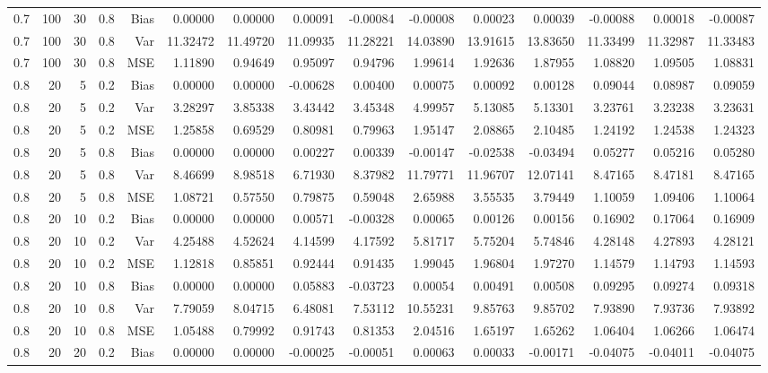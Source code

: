 \begin{table}[!htbp]
\begin{tabular}{lrrrrrrrrrrrrrr}
0.7 & 100 & 30 & 0.8 & Bias & 0.00000 & 0.00000 & 0.00091 & -0.00084 & -0.00008 & 0.00023 & 0.00039 & -0.00088 & 0.00018 & -0.00087 \\
0.7 & 100 & 30 & 0.8 & Var & 11.32472 & 11.49720 & 11.09935 & 11.28221 & 14.03890 & 13.91615 & 13.83650 & 11.33499 & 11.32987 & 11.33483 \\
0.7 & 100 & 30 & 0.8 & MSE & 1.11890 & 0.94649 & 0.95097 & 0.94796 & 1.99614 & 1.92636 & 1.87955 & 1.08820 & 1.09505 & 1.08831 \\
0.8 &  20 &  5 & 0.2 & Bias & 0.00000 & 0.00000 & -0.00628 & 0.00400 & 0.00075 & 0.00092 & 0.00128 & 0.09044 & 0.08987 & 0.09059 \\
0.8 &  20 &  5 & 0.2 & Var & 3.28297 & 3.85338 & 3.43442 & 3.45348 & 4.99957 & 5.13085 & 5.13301 & 3.23761 & 3.23238 & 3.23631 \\
0.8 &  20 &  5 & 0.2 & MSE & 1.25858 & 0.69529 & 0.80981 & 0.79963 & 1.95147 & 2.08865 & 2.10485 & 1.24192 & 1.24538 & 1.24323 \\
0.8 &  20 &  5 & 0.8 & Bias & 0.00000 & 0.00000 & 0.00227 & 0.00339 & -0.00147 & -0.02538 & -0.03494 & 0.05277 & 0.05216 & 0.05280 \\
0.8 &  20 &  5 & 0.8 & Var & 8.46699 & 8.98518 & 6.71930 & 8.37982 & 11.79771 & 11.96707 & 12.07141 & 8.47165 & 8.47181 & 8.47165 \\
0.8 &  20 &  5 & 0.8 & MSE & 1.08721 & 0.57550 & 0.79875 & 0.59048 & 2.65988 & 3.55535 & 3.79449 & 1.10059 & 1.09406 & 1.10064 \\
0.8 &  20 & 10 & 0.2 & Bias & 0.00000 & 0.00000 & 0.00571 & -0.00328 & 0.00065 & 0.00126 & 0.00156 & 0.16902 & 0.17064 & 0.16909 \\
0.8 &  20 & 10 & 0.2 & Var & 4.25488 & 4.52624 & 4.14599 & 4.17592 & 5.81717 & 5.75204 & 5.74846 & 4.28148 & 4.27893 & 4.28121 \\
0.8 &  20 & 10 & 0.2 & MSE & 1.12818 & 0.85851 & 0.92444 & 0.91435 & 1.99045 & 1.96804 & 1.97270 & 1.14579 & 1.14793 & 1.14593 \\
0.8 &  20 & 10 & 0.8 & Bias & 0.00000 & 0.00000 & 0.05883 & -0.03723 & 0.00054 & 0.00491 & 0.00508 & 0.09295 & 0.09274 & 0.09318 \\
0.8 &  20 & 10 & 0.8 & Var & 7.79059 & 8.04715 & 6.48081 & 7.53112 & 10.55231 & 9.85763 & 9.85702 & 7.93890 & 7.93736 & 7.93892 \\
0.8 &  20 & 10 & 0.8 & MSE & 1.05488 & 0.79992 & 0.91743 & 0.81353 & 2.04516 & 1.65197 & 1.65262 & 1.06404 & 1.06266 & 1.06474 \\
0.8 &  20 & 20 & 0.2 & Bias & 0.00000 & 0.00000 & -0.00025 & -0.00051 & 0.00063 & 0.00033 & -0.00171 & -0.04075 & -0.04011 & -0.04075 \\

\end{tabular}
\end{table}

